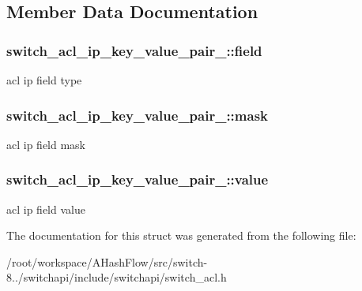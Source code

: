 \subsection{Member Data Documentation}
\hypertarget{structswitch__acl__ip__key__value__pair___a1ee520ef81f1bc45fa68576fd3a04fe2}{
\subsubsection[{field}]{ switch\+\_\+acl\+\_\+ip\+\_\+key\+\_\+value\+\_\+pair\+\_\+\+::field}}\label{structswitch__acl__ip__key__value__pair___a1ee520ef81f1bc45fa68576fd3a04fe2}
acl ip field type \hypertarget{structswitch__acl__ip__key__value__pair___a6c4f85b232dd2d767d4cf87a76af3fdb}{
\subsubsection[{mask}]{ switch\+\_\+acl\+\_\+ip\+\_\+key\+\_\+value\+\_\+pair\+\_\+\+::mask}}\label{structswitch__acl__ip__key__value__pair___a6c4f85b232dd2d767d4cf87a76af3fdb}
acl ip field mask \hypertarget{structswitch__acl__ip__key__value__pair___a9b5bde3e75594542c21441ac4c7fd1a6}{
\subsubsection[{value}]{ switch\+\_\+acl\+\_\+ip\+\_\+key\+\_\+value\+\_\+pair\+\_\+\+::value}}\label{structswitch__acl__ip__key__value__pair___a9b5bde3e75594542c21441ac4c7fd1a6}
acl ip field value 

The documentation for this struct was generated from the following file\+:\begin{DoxyCompactItemize}
\item 
/root/workspace/\+A\+Hash\+Flow/src/switch-\/8../switchapi/include/switchapi/switch\+\_\+acl.\+h\end{DoxyCompactItemize}

